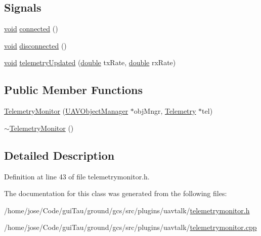 \subsection*{Signals}
\begin{DoxyCompactItemize}
\item 
\hyperlink{group___u_a_v_objects_plugin_ga444cf2ff3f0ecbe028adce838d373f5c}{void} \hyperlink{group___u_a_v_talk_plugin_gac4e867b78642d4f1fe27c5fc97468ce7}{connected} ()
\item 
\hyperlink{group___u_a_v_objects_plugin_ga444cf2ff3f0ecbe028adce838d373f5c}{void} \hyperlink{group___u_a_v_talk_plugin_ga8445fbd983df4d054bb798c760ba0640}{disconnected} ()
\item 
\hyperlink{group___u_a_v_objects_plugin_ga444cf2ff3f0ecbe028adce838d373f5c}{void} \hyperlink{group___u_a_v_talk_plugin_gac7898d4b74305c568adefb289da72ebc}{telemetry\-Updated} (\hyperlink{_super_l_u_support_8h_a8956b2b9f49bf918deed98379d159ca7}{double} tx\-Rate, \hyperlink{_super_l_u_support_8h_a8956b2b9f49bf918deed98379d159ca7}{double} rx\-Rate)
\end{DoxyCompactItemize}
\subsection*{Public Member Functions}
\begin{DoxyCompactItemize}
\item 
\hyperlink{group___u_a_v_talk_plugin_gad2af9cb530ef07a84cc9992d6458111f}{Telemetry\-Monitor} (\hyperlink{class_u_a_v_object_manager}{U\-A\-V\-Object\-Manager} $\ast$obj\-Mngr, \hyperlink{class_telemetry}{Telemetry} $\ast$tel)
\item 
\hyperlink{group___u_a_v_talk_plugin_gabe2f26f1992e78356a82b135aeac951e}{$\sim$\-Telemetry\-Monitor} ()
\end{DoxyCompactItemize}


\subsection{Detailed Description}


Definition at line 43 of file telemetrymonitor.\-h.



The documentation for this class was generated from the following files\-:\begin{DoxyCompactItemize}
\item 
/home/jose/\-Code/gui\-Tau/ground/gcs/src/plugins/uavtalk/\hyperlink{telemetrymonitor_8h}{telemetrymonitor.\-h}\item 
/home/jose/\-Code/gui\-Tau/ground/gcs/src/plugins/uavtalk/\hyperlink{telemetrymonitor_8cpp}{telemetrymonitor.\-cpp}\end{DoxyCompactItemize}
